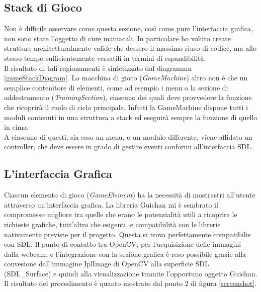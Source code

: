 \documentclass[a4paper,10pt, twocolumn]{article}
\begin{document}
  \subsection{Stack di Gioco}
  Non \`{e} difficile osservare come questa sezione, 
  cos\`{i} come pure l'interfaccia grafica, non sono state l'oggetto di cure maniacali.
  In particolare ho voluto create strutture architetturalmente valide che dessero il
  massimo riuso di codice, ma allo stesso tempo sufficientemente versatili in termini
  di espandibilit\`{a}.\\
  Il risultato di tali ragionamenti \`{e} sintetizzato dal diagramma \ref{gameStackDiagram}.
  La macchina di gioco (\textit{GameMachine}) altro non \`{e} che un semplice contenitore di
  elementi, come ad esempio i menu o la sezione di addestramento (\textit{TrainingSection}), 
  ciascuno dei quali deve provvedere la funzione che ricoprir\`{a} il ruolo di 
  ciclo principale. Infatti la GameMachine dispone tutti i moduli contenuti in una 
  struttura a stack ed eseguir\`{a} sempre la funzione di quello in cima.\\
  A ciascuno di questi, sia esso un menu, o un modulo differente, viene 
  affidato un controller, che deve essere in grado di gestire eventi 
  conformi all'interfaccia SDL.
    
  \subsection{L'interfaccia Grafica}
  Ciascun elemento di gioco (\textit{GameElement}) ha la necessit\`{a} di mostrastri all'utente
  attraverso un'interfaccia grafica. La libreria Guichan \cite{guichan} mi \`{e}
  sembrato il compromesso migliore tra quelle che erano
  le potenzialit\`{a} utili a ricoprire le richieste grafiche, tutt'altro che esigenti,
  e compatibilit\`{a} con le librerie nativamente previste per il progetto.
  Questa si trova perfettamente compatibilie con SDL. Il punto di contatto tra 
  OpenCV, per l'acquisizione delle immagini dalla webcam, e l'integrazione con 
  la sezione grafica \`{e} reso possibile grazie alla convesione dall'immagine 
  IplImage di OpenCV alla superficie SDL (SDL\_Surface) e quindi alla visualizzazione
  tramite l'opportuno oggetto Guichan. Il risultato del procedimento \`{e}
  quanto mostrato dal punto 2 di figura \ref{screenshot}.
  
\end{document}

